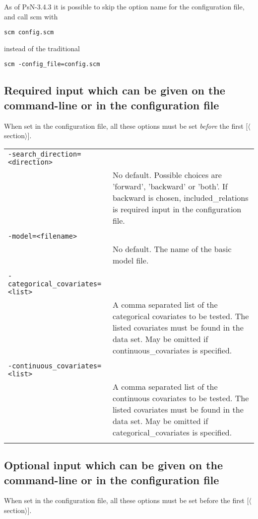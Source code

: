 \documentclass[a4paper,12pt]{article}
\begin{document}
As of PsN-3.4.3 it is possible to skip the option name for the configuration file, and call scm with
\begin{verbatim}
scm config.scm 
\end{verbatim}
instead of the traditional
\begin{verbatim}
scm -config_file=config.scm
\end{verbatim}

\subsection{Required input which can be given on the command-line or in the configuration file}
When set in the configuration file, all these options must be set \emph{before} the first [$\langle$section$\rangle$].

\begin{longtable}{p{1in}p{4in}}
\verb|-search_direction=<direction>| & \\
\nopagebreak
 & No default. Possible choices are 'forward', 'backward' or 'both'. If backward is chosen, included\_relations is required input in the configuration file. \\
\\
\verb|-model=<filename>| & \\
\nopagebreak
 & No default. The name of the basic model file. \\
\\
\verb|-categorical_covariates=<list>| & \\
\nopagebreak
 & A comma separated list of the categorical covariates to be tested. The listed covariates must be found in the data set. May be omitted if continuous\_covariates is specified. \\
\\
\verb|-continuous_covariates=<list>| & \\
\nopagebreak
 & A comma separated list of the continuous covariates to be tested. The listed covariates must be found in the data set. May be omitted if categorical\_covariates is specified. \\
\\
\end{longtable}

\subsection{Optional input which can be given on the command-line or in the configuration file}
When set in the configuration file, all these options must be set before the first [$\langle$section$\rangle$].
\end{document}
